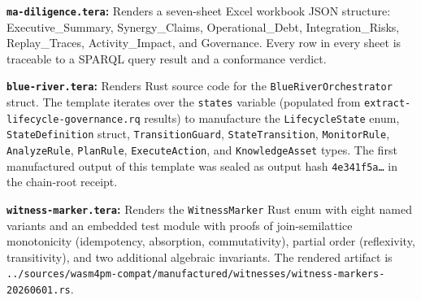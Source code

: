 \textbf{\texttt{ma-diligence.tera}:} Renders a seven-sheet Excel workbook JSON structure:
Executive\_Summary, Synergy\_Claims, Operational\_Debt, Integration\_Risks, Replay\_Traces,
Activity\_Impact, and Governance. Every row in every sheet is traceable to a SPARQL query result
and a conformance verdict.

\textbf{\texttt{blue-river.tera}:} Renders Rust source code for the \texttt{BlueRiverOrchestrator}
struct. The template iterates over the \texttt{states} variable (populated from
\texttt{extract-lifecycle-governance.rq} results) to manufacture the \texttt{LifecycleState}
enum, \texttt{StateDefinition} struct, \texttt{TransitionGuard}, \texttt{StateTransition},
\texttt{MonitorRule}, \texttt{AnalyzeRule}, \texttt{PlanRule}, \texttt{ExecuteAction}, and
\texttt{KnowledgeAsset} types. The first manufactured output of this template was sealed as
output hash \texttt{4e341f5a\ldots} in the chain-root receipt.

\textbf{\texttt{witness-marker.tera}:} Renders the \texttt{WitnessMarker} Rust enum with eight
named variants and an embedded test module with proofs of join-semilattice monotonicity (idempotency,
absorption, commutativity), partial order (reflexivity, transitivity), and two additional
algebraic invariants. The rendered artifact is
\texttt{../sources/wasm4pm-compat/manufactured/witnesses/witness-markers-20260601.rs}.
